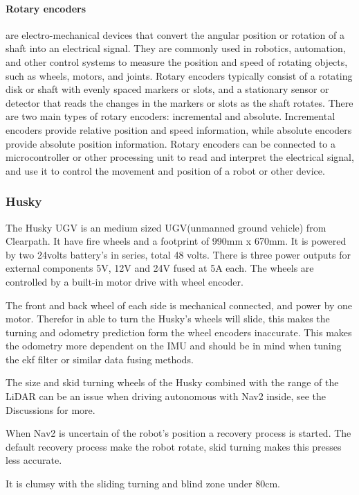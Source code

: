 \paragraph{Rotary encoders} are electro-mechanical devices that convert the angular position or rotation of a shaft into an electrical signal. They are commonly used in robotics, automation, and other control systems to measure the position and speed of rotating objects, such as wheels, motors, and joints. Rotary encoders typically consist of a rotating disk or shaft with evenly spaced markers or slots, and a stationary sensor or detector that reads the changes in the markers or slots as the shaft rotates. There are two main types of rotary encoders: incremental and absolute. Incremental encoders provide relative position and speed information, while absolute encoders provide absolute position information. Rotary encoders can be connected to a microcontroller or other processing unit to read and interpret the electrical signal, and use it to control the movement and position of a robot or other device.

\subsubsection{Husky}
The Husky UGV \cite{huskyugv} is an medium sized UGV(unmanned ground vehicle) from Clearpath. It have fire wheels and a footprint of 990mm x 670mm. It is powered by two 24volts battery's in series, total 48 volts. There is three power outputs for external components 5V, 12V and 24V fused at 5A each. The wheels are controlled by a built-in motor drive with wheel encoder.

The front and back wheel of each side is mechanical connected, and power by one motor. Therefor in able to turn the Husky's wheels will slide, this makes the turning and odometry prediction form the wheel encoders inaccurate. This makes the odometry more dependent on the IMU and should be in mind when tuning the ekf filter or similar data fusing methods.

The size and skid turning wheels of the Husky combined with the range of the LiDAR can be an issue when driving autonomous with Nav2 inside, see the Discussions for more. 

When Nav2 is uncertain of the robot's position a recovery process is started. The default recovery process make the robot rotate, skid turning makes this presses less accurate.

It is clumsy with the sliding turning and blind zone under 80cm. 

